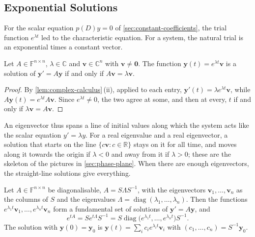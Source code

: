 \subsection{Exponential Solutions}

For the scalar equation $p(D)y=0$ of \cref{sec:constant-coefficients}, the trial function $e^{\lambda t}$ led to the characteristic equation. For a system, the natural trial is an exponential times a constant vector.

\begin{proposition}
\label{prop:exponential-solutions}
Let $A\in\mathbb F^{n\times n}$, $\lambda\in\mathbb C$ and $\mathbf v\in\mathbb C^n$ with $\mathbf v\ne\mathbf 0$. The function $\mathbf y(t)=e^{\lambda t}\mathbf v$ is a solution of $\mathbf y'=A\mathbf y$ if and only if $A\mathbf v=\lambda\mathbf v$.
\end{proposition}

\begin{proof}
By \cref{lem:complex-calculus}\,(ii), applied to each entry, $\mathbf y'(t)=\lambda e^{\lambda t}\mathbf v$, while $A\mathbf y(t)=e^{\lambda t}A\mathbf v$. Since $e^{\lambda t}\ne0$, the two agree at some, and then at every, $t$ if and only if $\lambda\mathbf v=A\mathbf v$.
\end{proof}

An eigenvector thus spans a line of initial values along which the system acts like the scalar equation $y'=\lambda y$. For a real eigenvalue and a real eigenvector, a solution that starts on the line $\{c\mathbf v:c\in\mathbb R\}$ stays on it for all time, and moves along it towards the origin if $\lambda<0$ and away from it if $\lambda>0$; these  are the skeleton of the pictures in \cref{sec:phase-plane}. When there are enough eigenvectors, the straight-line solutions give everything.

\begin{theorem}
\label{thm:diagonalisable-systems}
Let $A\in\mathbb F^{n\times n}$ be diagonalisable, $A=S\Lambda S^{-1}$, with the eigenvectors $\mathbf v_1,\ldots,\mathbf v_n$ as the columns of $S$ and the eigenvalues $\Lambda=\operatorname{diag}(\lambda_1,\ldots,\lambda_n)$. Then the functions $e^{\lambda_1t}\mathbf v_1,\ldots,e^{\lambda_nt}\mathbf v_n$ form a fundamental set of solutions of $\mathbf y'=A\mathbf y$, and
\[
e^{tA}=Se^{t\Lambda}S^{-1}=S\operatorname{diag}\bigl(e^{\lambda_1t},\ldots,e^{\lambda_nt}\bigr)S^{-1}.
\]
The solution with $\mathbf y(0)=\mathbf y_0$ is $\mathbf y(t)=\sum_ic_ie^{\lambda_it}\mathbf v_i$ with $(c_1,\ldots,c_n)=S^{-1}\mathbf y_0$.
\end{theorem}

